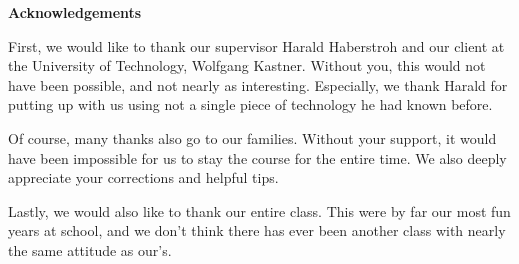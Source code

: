 \begin{flushleft}
	\Large
	\textbf{Acknowledgements\\}
	\vspace{1.5cm}

	\large
		First, we would like to thank our supervisor Harald Haberstroh and our client at the University of Technology, Wolfgang Kastner. Without you, this would not have been possible, and not nearly as interesting. Especially, we thank Harald for putting up with us using not a single piece of technology he had known before.
	
	Of course, many thanks also go to our families. Without your support, it would have been impossible for us to stay the course for the entire time. We also deeply appreciate your corrections and helpful tips.
	
	Lastly, we would also like to thank our entire class. This were by far our most fun years at school, and we don't think there has ever been another class with nearly the same attitude as our's.
\end{flushleft}
